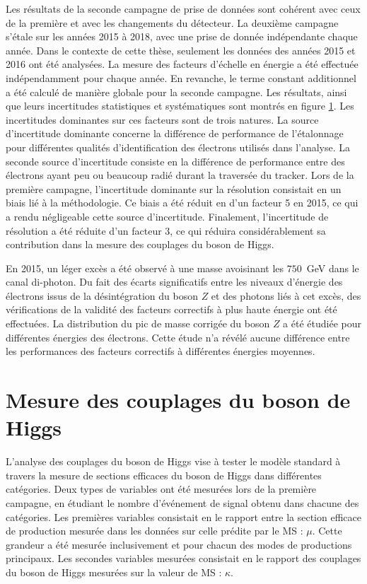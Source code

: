 Les résultats de la seconde campagne de prise de données sont cohérent avec ceux de la première et avec les changements du détecteur.
La deuxième campagne s'étale sur les années 2015 à 2018, avec une prise de donnée indépendante chaque année.
Dans le contexte de cette thèse, seulement les données des années 2015 et 2016 ont été analysées.
La mesure des facteurs d'échelle en énergie a été effectuée indépendamment pour chaque année.
En revanche, le terme constant additionnel a été calculé de manière globale pour la seconde campagne.
Les résultats, ainsi que leurs incertitudes statistiques et systématiques sont montrés en figure \ref{}.
Les incertitudes dominantes sur ces facteurs sont de trois natures.
La source d'incertitude dominante concerne la différence de performance de l'étalonnage pour différentes qualités d'identification des électrons utilisés dans l'analyse.
La seconde source d'incertitude consiste en la différence de performance entre des électrons ayant peu ou beaucoup radié durant la traversée du tracker.
Lors de la première campagne, l'incertitude dominante sur la résolution consistait en un biais lié à la méthodologie.
Ce biais a été réduit en d'un facteur 5 en 2015, ce qui a rendu négligeable cette source d'incertitude.
Finalement, l'incertitude de résolution a été réduite d'un facteur 3, ce qui réduira considérablement sa contribution dans la mesure des couplages du boson de Higgs.

En 2015, un léger excès a été observé à une masse avoisinant les $750$~GeV dans le canal di-photon.
Du fait des écarts significatifs entre les niveaux d'énergie des électrons issus de la désintégration du boson $Z$ et des photons liés à cet excès, des vérifications de la validité des facteurs correctifs à plus haute énergie ont été effectuées.
La distribution du pic de masse corrigée du boson $Z$ a été étudiée pour différentes énergies des électrons.
Cette étude n'a révélé aucune différence entre les performances des facteurs correctifs à différentes énergies moyennes.

\section{Mesure des couplages du boson de Higgs}

L'analyse des couplages du boson de Higgs vise à tester le modèle standard à travers la mesure de sections efficaces du boson de Higgs dans différentes catégories.
Deux types de variables ont été mesurées lors de la première campagne, en étudiant le nombre d'événement de signal obtenu dans chacune des catégories.
Les premières variables consistait en le rapport entre la section efficace de production mesurée dans les données sur celle prédite par le MS : $\mu$.
Cette grandeur a été mesurée inclusivement et pour chacun des modes de productions principaux.
Les secondes variables mesurées consistait en le rapport des couplages du boson de Higgs mesurées sur la valeur de MS : $\kappa$.

